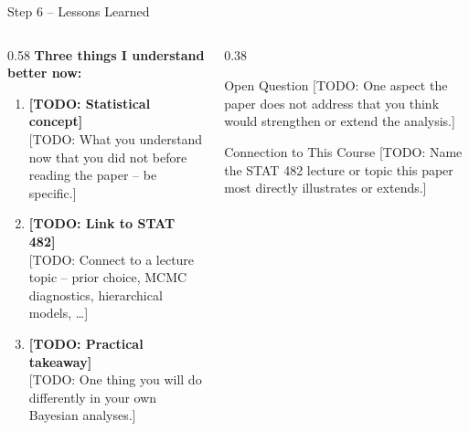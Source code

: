 \documentclass[aspectratio=169,11pt]{beamer}
\begin{document}
\begin{frame}{Step 6 -- Lessons Learned}

  \begin{columns}[T]
    \begin{column}{0.58\textwidth}
      \textbf{Three things I understand better now:}
      \vspace{5pt}
      \begin{enumerate}\small
        \item \textbf{[TODO: Statistical concept]}\\
              \small
              [TODO: What you understand now that you did not
              before reading the paper -- be specific.]
        \vspace{4pt}
        \item \textbf{[TODO: Link to STAT 482]}\\
              \small
              [TODO: Connect to a lecture topic -- prior choice,
              MCMC diagnostics, hierarchical models, \ldots]
        \vspace{4pt}
        \item \textbf{[TODO: Practical takeaway]}\\
              \small
              [TODO: One thing you will do differently
              in your own Bayesian analyses.]
      \end{enumerate}
    \end{column}
    \begin{column}{0.38\textwidth}
      \begin{alertblock}{Open Question}
        \small
        [TODO: One aspect the paper does not address that
        you think would strengthen or extend the analysis.]
      \end{alertblock}
      \vspace{6pt}
      \begin{exampleblock}{Connection to This Course}
        \small
        [TODO: Name the STAT 482 lecture or topic
        this paper most directly illustrates or extends.]
      \end{exampleblock}
    \end{column}
  \end{columns}

\end{frame}
\end{document}
